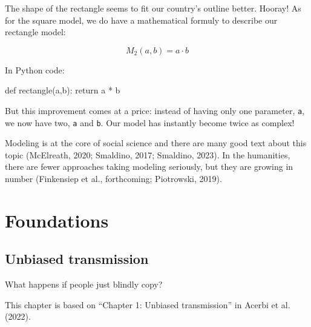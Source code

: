 \documentclass[
  a4paperpaper,
  ,captions=tableheading
]{scrbook}
\newenvironment{Shaded}{\begin{snugshade}}{\end{snugshade}}
\newcommand{\ControlFlowTok}[1]{\textcolor[rgb]{0.00,0.23,0.31}{#1}}
\newcommand{\KeywordTok}[1]{\textcolor[rgb]{0.00,0.23,0.31}{#1}}
\newcommand{\NormalTok}[1]{\textcolor[rgb]{0.00,0.23,0.31}{#1}}
\newcommand{\OperatorTok}[1]{\textcolor[rgb]{0.37,0.37,0.37}{#1}}
\begin{document}
The shape of the rectangle seems to fit our country's outline better.
Hooray! As for the square model, we do have a mathematical formuly to
describe our rectangle model:

\[M_2(a,b) = a \cdot b\]

In Python code:

\begin{Shaded}
\begin{Highlighting}[]
\KeywordTok{def}\NormalTok{ rectangle(a,b):}
    \ControlFlowTok{return}\NormalTok{ a }\OperatorTok{*}\NormalTok{ b}
\end{Highlighting}
\end{Shaded}

But this improvement comes at a price: instead of having only one
parameter, \texttt{a}, we now have two, \texttt{a} and \texttt{b}. Our
model has instantly become twice as complex!

Modeling is at the core of social science and there are many good text
about this topic (McElreath, 2020; Smaldino, 2017; Smaldino, 2023). In
the humanities, there are fewer approaches taking modeling seriously,
but they are growing in number (Finkensiep et al., forthcoming;
Piotrowski, 2019).

\part{Foundations}

\hypertarget{sec-unbiased_transmission}{%
\chapter{Unbiased transmission}\label{sec-unbiased_transmission}}

What happens if people just blindly copy?

\hfill\break

\begin{tcolorbox}[enhanced jigsaw, arc=.35mm, colbacktitle=quarto-callout-note-color!10!white, colback=white, breakable, toprule=.15mm, title=\textcolor{quarto-callout-note-color}{\faInfo}\hspace{0.5em}{Note}, left=2mm, bottomtitle=1mm, toptitle=1mm, leftrule=.75mm, opacitybacktitle=0.6, titlerule=0mm, opacityback=0, rightrule=.15mm, bottomrule=.15mm, coltitle=black, colframe=quarto-callout-note-color-frame]

This chapter is based on ``Chapter 1: Unbiased transmission'' in Acerbi
et al. (2022).

\end{tcolorbox}
\end{document}
